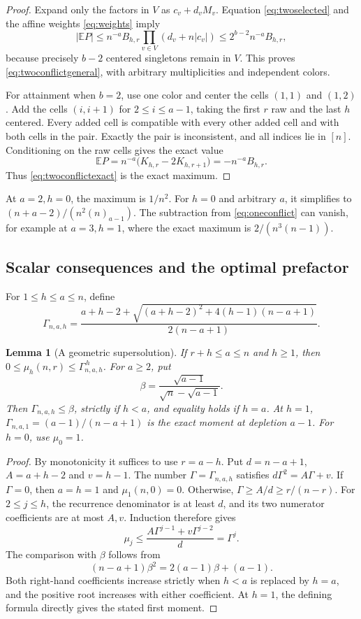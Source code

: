 \documentclass[11pt]{article}
\newtheorem{lemma}[theorem]{Lemma}
\theoremstyle{definition}
\theoremstyle{remark}
\newcommand{\E}{\mathbb E}
\newcommand{\1}{\mathbf 1}
\begin{document}
\begin{proof}
Expand only the factors in $V$ as $c_v+d_vM_v$. Equation \eqref{eq:twoselected} and the affine weights \eqref{eq:weights} imply
\[
|\E P|\le n^{-a}B_{h,r}
\prod_{v\in V}(d_v+n|c_v|)
\le2^{b-2}n^{-a}B_{h,r},
\]
because precisely $b-2$ centered singletons remain in $V$. This proves \eqref{eq:twoconflictgeneral}, with arbitrary multiplicities and independent colors.

For attainment when $b=2$, use one color and center the cells $(1,1)$ and $(1,2)$. Add the cells $(i,i+1)$ for $2\le i\le a-1$, taking the first $r$ raw and the last $h$ centered. Every added cell is compatible with every other added cell and with both cells in the pair. Exactly the pair is inconsistent, and all indices lie in $[n]$. Conditioning on the raw cells gives the exact value
\[
\E P=n^{-a}\bigl(K_{h,r}-2K_{h,r+1}\bigr)
=-n^{-a}B_{h,r}.
\]
Thus \eqref{eq:twoconflictexact} is the exact maximum.
\end{proof}

At $a=2,h=0$, the maximum is $1/n^2$. For $h=0$ and arbitrary $a$, it simplifies to $(n+a-2)/(n^2(n)_{a-1})$. The subtraction from \eqref{eq:oneconflict} can vanish, for example at $a=3,h=1$, where the exact maximum is $2/(n^3(n-1))$.

\subsection{Scalar consequences and the optimal prefactor}

For $1\le h\le a\le n$, define
\begin{equation}\label{eq:mixedgamma-def}
\Gamma_{n,a,h}=
\frac{a+h-2+\sqrt{(a+h-2)^2+4(h-1)(n-a+1)}}
{2(n-a+1)}.
\end{equation}
\begin{lemma}[A geometric supersolution]\label{lem:super}
If $r+h\le a\le n$ and $h\ge1$, then
$0\le\mu_h(n,r)\le\Gamma_{n,a,h}^{\,h}$.
For $a\ge2$, put
\[
\beta=\frac{\sqrt{a-1}}{\sqrt n-\sqrt{a-1}}.
\]
Then $\Gamma_{n,a,h}\le\beta$, strictly if $h<a$, and equality holds if $h=a$. At $h=1$, $\Gamma_{n,a,1}=(a-1)/(n-a+1)$ is the exact moment at depletion $a-1$. For $h=0$, use $\mu_0=1$.
\end{lemma}
\begin{proof}
By monotonicity it suffices to use $r=a-h$. Put
$d=n-a+1$, $A=a+h-2$ and $v=h-1$. The number $\Gamma=\Gamma_{n,a,h}$ satisfies
$d\Gamma^2=A\Gamma+v$. If $\Gamma=0$, then $a=h=1$ and $\mu_1(n,0)=0$. Otherwise,
$\Gamma\ge A/d\ge r/(n-r)$.
For $2\le j\le h$, the recurrence denominator is at least $d$, and its two numerator coefficients are at most $A,v$. Induction therefore gives
\[
\mu_j\le\frac{A\Gamma^{j-1}+v\Gamma^{j-2}}d=\Gamma^j.
\]
The comparison with $\beta$ follows from
\begin{equation}\label{eq:beta}
(n-a+1)\beta^2=2(a-1)\beta+(a-1).
\end{equation}
Both right-hand coefficients increase strictly when $h<a$ is replaced by $h=a$, and the positive root increases with either coefficient. At $h=1$, the defining formula directly gives the stated first moment.
\end{proof}
\end{document}
